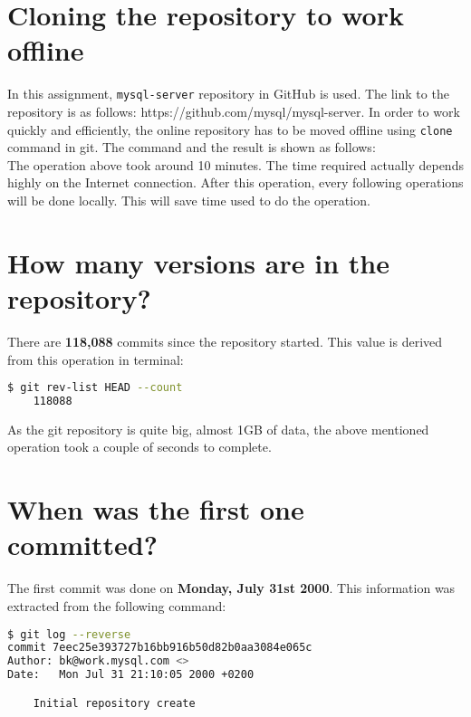 \section*{Cloning the repository to work offline}
In this assignment, \texttt{mysql-server} repository in GitHub is used. The link to the repository is as follows: https://github.com/mysql/mysql-server. In order to work quickly and efficiently, the online repository has to be moved offline using \texttt{clone} command in git. The command and the result is shown as follows:\\



The operation above took around 10 minutes. The time required actually depends highly on the Internet connection. After this operation, every following operations will be done locally. This will save time used to do the operation.

\section*{How many versions are in the repository?}
There are \textbf{118,088} commits since the repository started. This value is derived from this operation in terminal:

\begin{lstlisting}[language=bash,caption=Command to get commit count., label=code:count]
	$ git rev-list HEAD --count
	118088
\end{lstlisting}

As the git repository is quite big, almost 1GB of data, the above mentioned operation took a couple of seconds to complete.

\section*{When was the first one committed?}
The first commit was done on \textbf{Monday, July 31st 2000}. This information was extracted from the following command:

\begin{lstlisting}[language=bash,caption=Command to get first commit., label=code:firstCommit]
$ git log --reverse
commit 7eec25e393727b16bb916b50d82b0aa3084e065c
Author: bk@work.mysql.com <>
Date:   Mon Jul 31 21:10:05 2000 +0200

    Initial repository create
\end{lstlisting}

